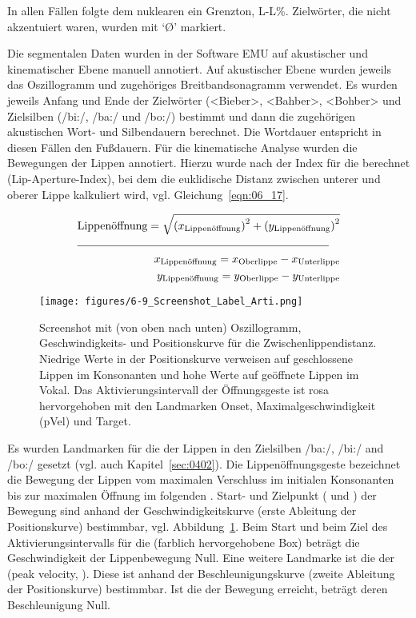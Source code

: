 In allen Fällen folgte dem nuklearen  ein Grenzton, L-L\%. Zielwörter, die nicht akzentuiert waren, wurden mit ‘Ø’ markiert. 

Die segmentalen Daten wurden in der Software EMU \citep{Cassidy2001} auf akustischer und kinematischer Ebene manuell annotiert. Auf akustischer Ebene wurden jeweils das Oszillogramm und zugehöriges Breitbandsonagramm verwendet. Es wurden jeweils Anfang und Ende der Zielwörter (<Bieber>, <Bahber>, <Bohber> und Zielsilben (/bi:/, /ba:/ und /bo:/) bestimmt und dann die zugehörigen akustischen Wort- und Silbendauern berechnet. Die Wortdauer entspricht in diesen Fällen den Fußdauern. Für die kinematische Analyse wurden die Bewegungen der Lippen annotiert. Hierzu wurde nach \citet[6]{Byrd2000a} der Index für die  berechnet (Lip-Aperture-Index), bei dem die euklidische Distanz zwischen unterer und oberer Lippe kalkuliert wird, vgl. Gleichung~\ref{eqn:06_17}.

\begin{align}
\label{eqn:06_17}
\text{Lippenöffnung} = \sqrt{\left(x_{\text{Lippenöffnung}}\right)^2 + \left(y_{\text{Lippenöffnung}}\right)^2}\\ \cline{1-2}
x_{\text{Lippenöffnung}} = x_{\text{Oberlippe}} - x_{\text{Unterlippe}} \nonumber \\
y_{\text{Lippenöffnung}} = y_{\text{Oberlippe}} - y_{\text{Unterlippe}} \nonumber%
\end{align}

\begin{figure}[b]
	\texttt{[image: figures/6-9\_Screenshot\_Label\_Arti.png]}
	\caption{Screenshot mit (von oben nach unten) Oszillogramm, Geschwindigkeits- und Positionskurve für die Zwischenlippendistanz. Niedrige Werte in der Positionskurve verweisen auf geschlossene Lippen im Konsonanten und hohe Werte auf geöffnete Lippen im Vokal. Das Aktivierungsintervall der Öffnungsgeste ist rosa hervorgehoben mit den Landmarken Onset, Maximalgeschwindigkeit (pVel) und Target.}
	\label{figure:0609}
\end{figure}

Es wurden Landmarken für die  der Lippen in den Zielsilben /ba:/, /bi:/ and /bo:/ gesetzt (vgl. auch Kapitel~\ref{sec:0402}). Die Lippenöffnungsgeste bezeichnet die Bewegung der Lippen vom maximalen Verschluss im initialen Konsonanten bis zur maximalen Öffnung im folgenden . Start- und Zielpunkt ( und ) der Bewegung sind anhand der Geschwindigkeitskurve (erste Ableitung der Positionskurve) bestimmbar, vgl. Abbildung~\ref{figure:0609}. Beim Start und beim Ziel des Aktivierungsintervalls für die  (farblich hervorgehobene Box) beträgt die Geschwindigkeit der Lippenbewegung Null. Eine weitere Landmarke ist die  der  (peak velocity, ). Diese ist anhand der Beschleunigungskurve (zweite Ableitung der Positionskurve) bestimmbar. Ist die  der Bewegung erreicht, beträgt deren Beschleunigung Null.



